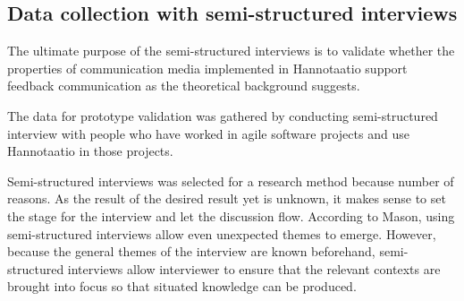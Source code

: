\documentclass[english,12pt,a4paper,pdftex]{article}
\begin{document}
\subsection{Data collection with semi-structured interviews}

The ultimate purpose of the semi-structured interviews is to validate whether the properties of communication media implemented in Hannotaatio support feedback communication as the theoretical background suggests. 

The data for prototype validation was gathered by conducting semi-structured interview with people who have worked in agile software projects and use Hannotaatio in those projects.

Semi-structured interviews was selected for a research method because number of reasons. As the result of the desired result yet is unknown, it makes sense to set the stage for the interview and let the discussion flow. According to Mason, using semi-structured interviews allow even unexpected themes to emerge. However, because the general themes of the interview are known beforehand, semi-structured interviews allow interviewer to ensure that the relevant contexts are brought into focus so that situated knowledge can be produced. \citep{mason2004}
\end{document}
